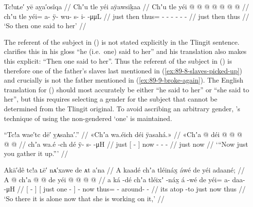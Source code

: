 \ex\label{ex:89-10-so-he-said-to-her}%
%
\begingl
	\glpreamble	Tc!uʟe′ yē aỵa′osîqa //
	\glpreamble	Chʼu tle yéi aÿawsiḵaa //
	\gla	Chʼu tle yéi @  @ {} @ {} @ {} @ {} @ {} @ {} //
	\glb	chʼu tle yéi= a- ÿ- wu- s- i-  -μμL //
	\glc	just then thus= - - - - -  - //
	\gld	just then thus  {} {} {} {} {} {} //
	\glft	‘So then one said to her’
		//
\endgl
\xe

The referent of the subject in (\lastx) is not stated explicitly in the Tlingit sentence.
\citeauthor{swanton:1909} clarifies this in his gloss “he (i.e.\ one) said to her” and his translation also makes this explicit: “Then one said to her”.
Thus the referent of the subject in (\lastx) is therefore one of the father’s slaves last mentioned in (\ref{ex:89-8-slaves-picked-up}) and crucially is not the father mentioned in (\ref{ex:89-9-broke-again}).
The English translation for (\lastx) should most accurately be either “he said to her” or “she said to her”, but this requires selecting a gender for the subject that cannot be determined from the Tlingit original.
To avoid ascribing an arbitrary gender, \citeauthor{swanton:1909}’s technique of using the non-gendered ‘one’ is maintained.

\ex\label{ex:89-11-you-gather-it-up}%
%
\begingl
	\glpreamble	“Tc!a wae′tc dē′ ỵᴀsaha′.” //
	\glpreamble	«\!Chʼa wa.éich déi ÿasahá.\!» //
	\gla	«\!Chʼa {}  @ {} {} déi
		 @ {} @ {} @ {} @ {} @ {} //
	\glb	\pqp{}chʼa {} wa.é -ch {} dé
		ÿ- {} {} s-  -μH //
	\glc	\pqp{}just {}[  - {}] now
		- \· \· -  - //
	\gld	\pqp{}just {}  {} {} now
		 {} {} {} {} {} //
	\glft	‘“Now just you gather it up.”’
		//
\endgl
\xe

\ex\label{ex:89-12-working-alone}%
%
\begingl
	\glpreamble	Akā′dê tc!a ʟē′ nᴀ′xawe de ᴀt a′na //
	\glpreamble	A kaadé chʼa tléináx̱ áwé de yéi adaané; //
	\gla	{} A  @ {} {}
		{} chʼa  @ {} {}
		 @ {}
		de
		yéi @  @ {} @ {} @ {} //
	\glb	{} a ká -dé {}
		{} chʼa tléixʼ -náx̱ {}
		á -wé
		de
		yéi= a- daa-  -μH //
	\glc	{}[   - {}]
		{}[ just one - {}]
		 -
		now
		thus= - around-  - //
	\gld	{} its atop -to {}
		{} just  {} {}
		 {}
		now
		thus  {} {} {} //
	\glft	‘So there it is alone now that she is working on it,’
		//
\endgl
\xe

